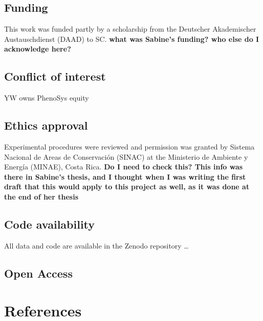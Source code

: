 \documentclass[
]{article}
\begin{document}
\hypertarget{funding-1}{%
\subsection{Funding}\label{funding-1}}

This work was funded partly by a scholarship from the Deutscher Akademischer Austauschdienst (DAAD) to SC. \textbf{what was Sabine's funding? who else do I acknowledge here?}

\hypertarget{conflict-of-interest}{%
\subsection{Conflict of interest}\label{conflict-of-interest}}

YW owns PhenoSys equity

\hypertarget{ethics-approval}{%
\subsection{Ethics approval}\label{ethics-approval}}

Experimental procedures were reviewed and permission was granted by Sistema Nacional de Areas de Conservación (SINAC) at the Ministerio de Ambiente y Energía (MINAE), Costa Rica. \textbf{Do I need to check this? This info was there in Sabine's thesis, and I thought when I was writing the first draft that this would apply to this project as well, as it was done at the end of her thesis}

\hypertarget{code-availability}{%
\subsection{Code availability}\label{code-availability}}

All data and code are available in the Zenodo repository \ldots{}

\hypertarget{open-access}{%
\subsection{Open Access}\label{open-access}}

\hypertarget{references}{%
\section*{References}\label{references}}
\end{document}
